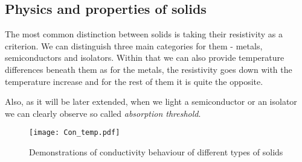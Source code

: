 
\subsection{Physics and properties of solids}
The most common distinction between solids is taking their resistivity as a criterion. We can distinguish three main categories for them - metals, semiconductors and isolators. Within that we can also provide temperature differences beneath them as for the metals, the resistivity goes down with the temperature increase and for the rest of them it is quite the opposite.

Also, as it will be later extended, when we light a semiconductor or an isolator we can clearly observe so called \textit{absorption threshold}. 
\begin{figure}[H]
\centering
\texttt{[image: Con\_temp.pdf]}
\caption{Demonstrations of conductivity behaviour of different types of solids}
\end{figure}
